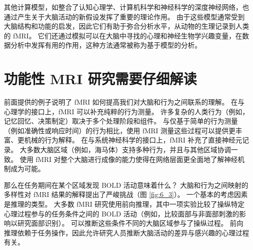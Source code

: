 其他计算模型，如整合了认知心理学、计算机科学和神经科学的深度神经网络，也通过产生关于大脑活动的新假设发挥了重要的理论作用。 
由于这些模型通常受到大脑结构和功能的启发，因此它们有助于弥合分析水平，从动物的生理记录到人类的 fMRI。 
它们还通过模拟可以在大脑中寻找的心理和神经生物学兴趣变量，在数据分析中发挥有用的作用，这种方法通常被称为基于模型的分析。



\section{功能性 MRI 研究需要仔细解读}

前面提供的例子说明了 fMRI 如何提高我们对大脑和行为之间联系的理解。 
在与心理学的接口上，fMRI 可以补充纯粹的行为测量。 
许多复杂的人类行为（例如，记忆回忆、决策制定）取决于多个处理阶段和组件。 
与仅基于简单的行为测量（例如准确性或响应时间）的行为相比，使用 fMRI 测量这些过程可以提供更丰富、更机械的行为解释。 
在与系统神经科学的接口上，fMRI 补充了直接神经元记录。 
大多数大脑区域（例如，海马体）支持多种行为，并且与其他区域协调一致。 
使用 fMRI 对整个大脑进行成像的能力使得在网络层面更全面地了解神经机制成为可能。


那么在任务期间在某个区域发现 BOLD 活动意味着什么？ 
大脑和行为之间映射的多样性对 fMRI 结果的解释提出了严峻挑战（图 \ref{fig:6_3}）。 
一个基本的考虑因素是推理的类型。 
大多数 fMRI 研究使用前向推理，其中一项实验比较了操纵特定心理过程参与的任务条件之间的 BOLD 活动（例如，比较面部与非面部刺激的影响以研究面部识别）。 
可以推断这些条件不同的大脑区域参与了操纵过程。 
前向推理依赖于任务操作，因此允许研究人员推断大脑活动的差异与感兴趣的心理过程有关。


